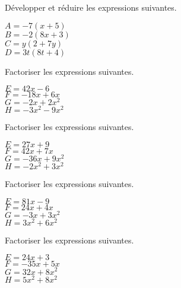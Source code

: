 \documentclass[a4paper,11pt,fleqn]{article}		%
\begin{document}
\begin{multicols}{2}
Développer et réduire les expressions suivantes.

\begin{multicols}{2}
$A=  -7 (x  +5)$\\
$B= -2 ( 8 x    +3)$\\
$C=y( 2  +7 y)$\\
$D= 3  t(  8 t +4)$
\end{multicols}


Factoriser les expressions suivantes.

\begin{multicols}{2}
$E=  42 x  -6$\\
$F=  -18 x  +6 x$\\
$G=  -2 x  +2 x^2$\\
$H=  -3 x^2  -9 x^2$
\end{multicols}


Factoriser les expressions suivantes.

\begin{multicols}{2}
$E=  27 x  +9$\\
$F=  42 x  +7 x$\\
$G=  -36 x  +9 x^2$\\
$H=  -2 x^2  +3 x^2$
\end{multicols}


Factoriser les expressions suivantes.

\begin{multicols}{2}
$E=  81 x  -9$\\
$F=  24 x  +4 x$\\
$G=  -3 x  +3 x^2$\\
$H=  3 x^2  +6 x^2$
\end{multicols}


Factoriser les expressions suivantes.

\begin{multicols}{2}
$E=  24 x  +3$\\
$F=  -35 x  +5 x$\\
$G=  32 x  +8 x^2$\\
$H=  5 x^2  +8 x^2$
\end{multicols}

\raggedcolumns
\end{multicols}

\exon{}
\end{document}

